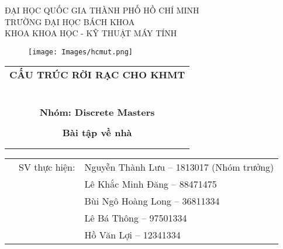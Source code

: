 \documentclass[a4paper]{article}
\begin{document}
\begin{titlepage}
\begin{center}
ĐẠI HỌC QUỐC GIA THÀNH PHỐ HỒ CHÍ MINH \\
TRƯỜNG ĐẠI HỌC BÁCH KHOA \\
KHOA KHOA HỌC - KỸ THUẬT MÁY TÍNH 
\end{center}

\vspace{1cm}

\begin{figure}[h!]
\begin{center}
\texttt{[image: Images/hcmut.png]}
\end{center}
\end{figure}

\vspace{1cm}


\begin{center}
\begin{tabular}{c}
\multicolumn{1}{l}{\textbf{{\Large CẤU TRÚC RỜI RẠC CHO KHMT}}}\\
~~\\
\hline
\\
\textbf{{\Large Nhóm: Discrete Masters}}\\
\\
\textbf{{\Huge Bài tập về nhà}} \\ \\ \\

\hline
\end{tabular}
\end{center}

\vspace{1.5cm}

\begin{table}[h]
\begin{tabular}{rrl} 
\hspace{5 cm} & SV thực hiện: & Nguyễn Thành Lưu -- 1813017 (Nhóm trưởng) \\
& & Lê Khắc Minh Đăng -- 88471475 \\
& & Bùi Ngô Hoàng Long -- 36811334 \\
& & Lê Bá Thông -- 97501334 \\
& & Hồ Văn Lợi -- 12341334 \\
\end{tabular}
\end{table}
\vspace{1.5cm}
\end{titlepage}
\end{document}

